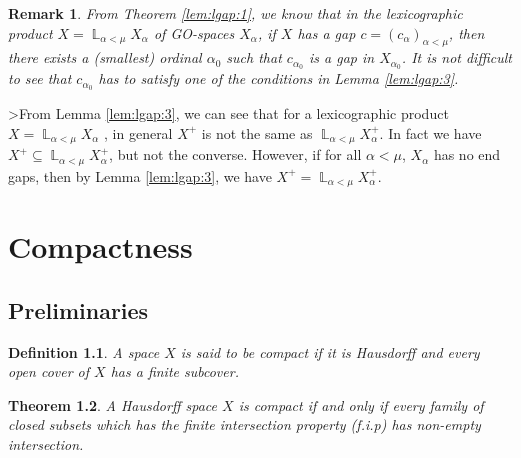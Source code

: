 \documentclass[12pt,oneside,english]{amsbook}
\numberwithin{equation}{section} %
\numberwithin{figure}{section} %
\theoremstyle{plain}
\numberwithin{section}{chapter}
\newtheorem{thm}{Theorem}[section]
\theoremstyle{plain}
\newtheorem{defn}[thm]{Definition}
\newtheorem{remark}[thm]{Remark}
\DeclareMathOperator{\LP}{\mathbb{L}}
\begin{document}
\begin{remark}
  From Theorem \ref{lem:lgap:1}, we know that in the lexicographic product $X = \LP_{\alpha < \mu}X_{\alpha}$ of GO-spaces $X_{\alpha}$, if $X$ has a gap $c = (c_{\alpha})_{\alpha < \mu}$, then there exists a (smallest) ordinal $\alpha_0$ such that $c_{\alpha_0}$ is a gap in $X_{\alpha_0}$. It is not difficult to see that $c_{\alpha_0}$ has to satisfy one of the conditions in Lemma \ref{lem:lgap:3}.
\end{remark}
>From Lemma \ref{lem:lgap:3}, we can see that for a lexicographic product $X = \LP_{\alpha < \mu}X_{\alpha}$ , in general $X^+$ is not the same as $\LP_{\alpha < \mu}X_{\alpha}^+$. In fact we have $X^+ \subseteq \LP_{\alpha < \mu}X_{\alpha}^+$, but not the converse. However, if for all $\alpha < \mu$, $X_{\alpha}$ has no end gaps, then by Lemma \ref{lem:lgap:3}, we have $X^+ = \LP_{\alpha < \mu}X_{\alpha}^+$. 
  
\chapter{Compactness}
\section{Preliminaries}
\begin{defn}
  A space $X$ is said to be compact if it is Hausdorff and every open cover of $X$ has a finite subcover.
\end{defn}

\begin{thm}
  A Hausdorff space $X$ is compact if and only if every family of closed subsets which has the finite intersection property (f.i.p) has non-empty intersection.
\end{thm}
\end{document}
